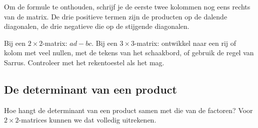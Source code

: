 Om de formule te onthouden, schrijf je de eerste twee kolommen nog eens rechts van de matrix. De drie positieve termen zijn de producten op de dalende diagonalen, de drie negatieve die op de stijgende diagonalen.


\begin{werkwijze}
Bij een $2 \times 2$-matrix: $ad - bc$. Bij een $3 \times 3$-matrix: ontwikkel naar een rij of kolom met veel nullen, met de tekens van het schaakbord, of gebruik de regel van Sarrus. Controleer met het rekentoestel als het mag.
\end{werkwijze}

\begin{oefeningen}
\end{oefeningen}

\subsection{De determinant van een product}

Hoe hangt de determinant van een product samen met die van de factoren? Voor $2 \times 2$-matrices kunnen we dat volledig uitrekenen.

